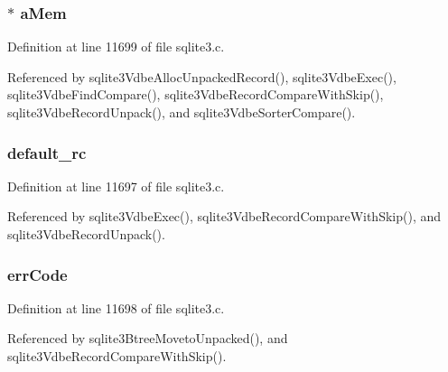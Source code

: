 \subsubsection[{a\+Mem}]{$\ast$ a\+Mem}\label{struct_unpacked_record_adfd56f8b1cc1790601ff0940d884c200}


Definition at line 11699 of file sqlite3.\+c.



Referenced by sqlite3\+Vdbe\+Alloc\+Unpacked\+Record(), sqlite3\+Vdbe\+Exec(), sqlite3\+Vdbe\+Find\+Compare(), sqlite3\+Vdbe\+Record\+Compare\+With\+Skip(), sqlite3\+Vdbe\+Record\+Unpack(), and sqlite3\+Vdbe\+Sorter\+Compare().

\hypertarget{struct_unpacked_record_ad90ccdf8e51753853ad6479dcd75677e}{}
\subsubsection[{default\+\_\+rc}]{ default\+\_\+rc}\label{struct_unpacked_record_ad90ccdf8e51753853ad6479dcd75677e}


Definition at line 11697 of file sqlite3.\+c.



Referenced by sqlite3\+Vdbe\+Exec(), sqlite3\+Vdbe\+Record\+Compare\+With\+Skip(), and sqlite3\+Vdbe\+Record\+Unpack().

\hypertarget{struct_unpacked_record_a29338b8c3b03fac4668584ae6150e70b}{}
\subsubsection[{err\+Code}]{ err\+Code}\label{struct_unpacked_record_a29338b8c3b03fac4668584ae6150e70b}


Definition at line 11698 of file sqlite3.\+c.



Referenced by sqlite3\+Btree\+Moveto\+Unpacked(), and sqlite3\+Vdbe\+Record\+Compare\+With\+Skip().

\hypertarget{struct_unpacked_record_a51c97c897154719f621dbc598c86cda5}{}
